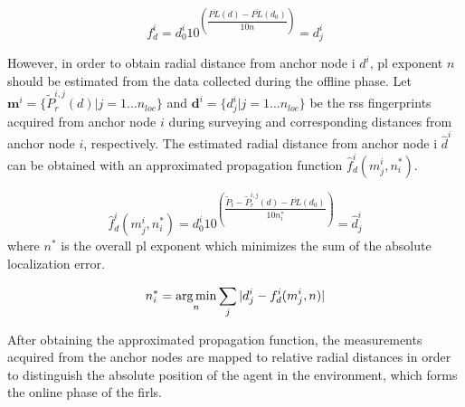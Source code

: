    \begin{equation}
      \label{eq:log-distance-d}
      f^i_{d} = d^i_0 10^{\left(\dfrac{\overline{PL}(d)-\overline{PL}(d_0)}{10 n} \right)} = d^i_j
    \end{equation}


    However, in order to obtain radial distance from anchor node i $d^i$, \gls{pl} exponent $n$ should be estimated from the data collected during the offline phase.
    Let $\bm{m}^i = \{\widetilde{P}_r^{i,j}(d) | j=1 \ldots n_{loc} \}$ and $\bm{d}^i = \{ d^i_j | j = 1 \ldots n_{loc}\}$ be the \gls{rss} fingerprints acquired from anchor node $i$ during surveying and corresponding distances from anchor node $i$, respectively.
    The estimated radial distance from anchor node i $\hat{d}^i$ can be obtained with an approximated propagation function $\hat{f}^i_d(m^i_j, n_i^*)$.

    \begin{equation}
      \label{eq:log-distance-d-app}
      \hat{f}^i_d(m^i_j, n_i^*) = d^i_0 10^{\left(\dfrac{\widetilde{P}_t - \widetilde{P}_r^{i,j}(d) - \overline{PL}(d_0)}{10 n_i^*} \right)} = \hat{d}^i_j
    \end{equation}
    where $n^*$ is the overall \gls{pl} exponent which minimizes the sum of the absolute localization error.

    \begin{equation}
      \label{eq:optimal-ple}
      n^*_i = \argmin_n \sum_j |d^i_j - f^i_d(m^i_j, n)|
    \end{equation}

    After obtaining the approximated propagation function, the measurements acquired from the anchor nodes are mapped to relative radial distances in order to distinguish the absolute position of the agent in the environment, which forms the online phase of the \gls{firl}s.
